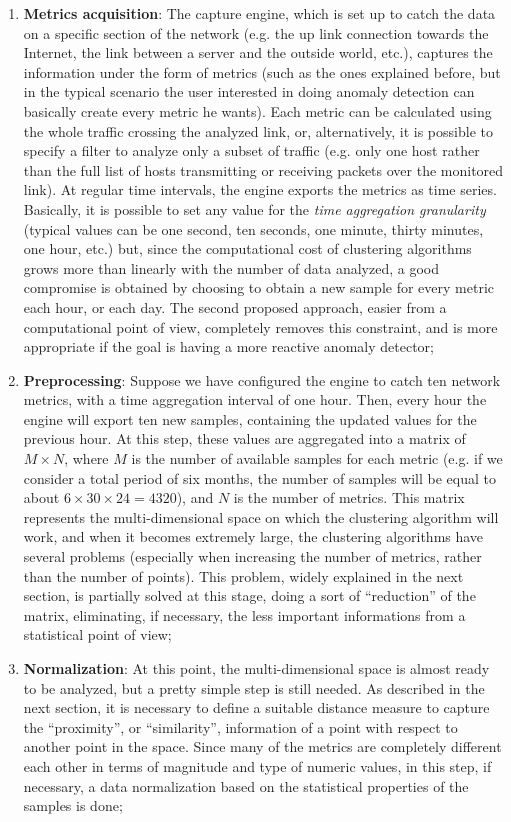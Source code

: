 \documentclass[12pt,a4paper,cucitura]{toptesi}
\begin{document}
\begin{enumerate}
\item \textbf{Metrics acquisition}: The capture engine, which is set up to catch the data on a specific section of the network (e.g. the up link connection towards the Internet, the link between a server and the outside world, etc.), captures the information under the form of metrics (such as the ones explained before, but in the typical scenario the user interested in doing anomaly detection can basically create every metric he wants). Each metric can be calculated using the whole traffic crossing the analyzed link, or, alternatively, it is possible to specify a filter to analyze only a subset of traffic (e.g. only one host rather than the full list of hosts transmitting or receiving packets over the monitored link). At regular time intervals, the engine exports the metrics as time series. Basically, it is possible to set any value for the \emph{time aggregation granularity} (typical values can be one second, ten seconds, one minute, thirty minutes, one hour, etc.) but, since the computational cost of clustering algorithms grows more than linearly with the number of data analyzed, a good compromise is obtained by choosing to obtain a new sample for every metric each hour, or each day. The second proposed approach, easier from a computational point of view, completely removes this constraint, and is more appropriate if the goal is having a more reactive anomaly detector;
\item \textbf{Preprocessing}: Suppose we have configured the engine to catch ten network metrics, with a time aggregation interval of one hour. Then, every hour the engine will export ten new samples, containing the updated values for the previous hour. At this step, these values are aggregated into a matrix of $M \times N$, where $M$ is the number of available samples for each metric (e.g. if we consider a total period of six months, the number of samples will be equal to about $6 \times 30 \times 24 = 4320$), and $N$ is the number of metrics. This matrix represents the multi-dimensional space on which the clustering algorithm will work, and when it becomes extremely large, the clustering algorithms have several problems (especially when increasing the number of metrics, rather than the number of points). This problem, widely explained in the next section, is partially solved at this stage, doing a sort of ``reduction'' of the matrix, eliminating, if necessary, the less important informations from a statistical point of view;
\item \textbf{Normalization}: At this point, the multi-dimensional space is almost ready to be analyzed, but a pretty simple step is still needed. As described in the next section, it is necessary to define a suitable distance measure to capture the ``proximity'', or ``similarity'',  information of a point with respect to another point in the space. Since many of the metrics are completely different each other in terms of magnitude and type of numeric values, in this step, if necessary, a data normalization based on the statistical properties of the samples is done;

\end{enumerate}
\end{document}
